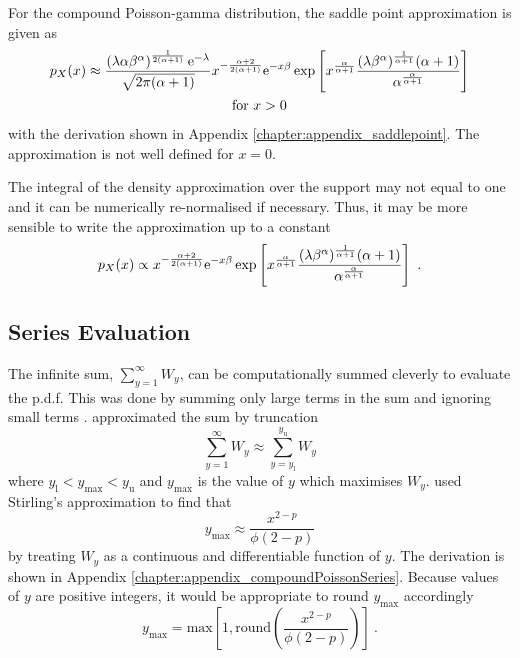 For the compound Poisson-gamma distribution, the saddle point approximation \citep{jensen1991saddlepoint} is given as 
\begin{multline}
  p_X(x)\approx
  \frac{\left(\lambda\alpha\beta^\alpha\right)^{\frac{1}{2(\alpha+1)}}\mathrm{e}^{-\lambda}}{\sqrt{2\pi(\alpha+1)}}x^{-\frac{\alpha+2}{2(\alpha+1)}}
  \mathrm{e}^{-x\beta}
  \exp\left[x^{\frac{\alpha}{\alpha+1}}
    \frac{(\lambda\beta^\alpha)^{\frac{1}{\alpha+1}}(\alpha+1)}{\alpha^{\frac{\alpha}{\alpha+1}}}
  \right]
  \\
  \text{for }x>0
  \label{eq:saddle_point_approx}
\end{multline}
with the derivation shown in Appendix \ref{chapter:appendix_saddlepoint}. The approximation is not well defined for $x=0$.

The integral of the density approximation over the support may not equal to one and it can be numerically re-normalised if necessary. Thus, it may be more sensible to write the approximation up to a constant
\begin{equation}
  p_X(x)\propto x^{-\frac{\alpha+2}{2(\alpha+1)}}\mathrm{e}^{-x\beta}
  \exp\left[
    x^{\frac{\alpha}{\alpha+1}}
    \frac{
      (\lambda\beta^\alpha)^{\frac{1}{\alpha+1}}(\alpha+1)
    }
    {
      \alpha^{\frac{\alpha}{\alpha+1}}
    }
  \right]
  \ .
\end{equation}

\subsection{Series Evaluation}

The infinite sum, $\sum_{y=1}^\infty W_y$, can be computationally summed cleverly to evaluate the p.d.f. This was done by summing only large terms in the sum and ignoring small terms \citep{dunn2005series}. \cite{dunn2005series} approximated the sum by truncation
\begin{equation}
  \sum_{y=1}^\infty W_y \approx \sum_{y=y_\text{l}}^{y_\text{u}}W_y
\end{equation}
where $y_\text{l}<y_{\text{max}}<y_\text{u}$ and $y_{\text{max}}$ is the value of $y$ which maximises $W_y$. \cite{dunn2005series} used Stirling's approximation to find that
\begin{equation}
  y_{\text{max}} \approx \frac{x^{2-p}}{\phi(2-p)}
\end{equation}
by treating $W_y$ as a continuous and differentiable function of $y$. The derivation is shown in Appendix \ref{chapter:appendix_compoundPoissonSeries}. Because values of $y$ are positive integers, it would be appropriate to round $y_\text{max}$ accordingly
\begin{equation}
  y_{\text{max}} = \text{max}\left[
    1,\text{round}\left(\frac{x^{2-p}}{\phi(2-p)}\right)
  \right]
  \ .
\end{equation}

